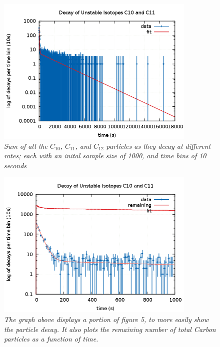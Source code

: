 \documentclass[11pt]{article}
\begin{document}
\begin{figure}[H]
  \begin{center}
\centerline{\includegraphics[width=3.75in]{unstabledecaynozoom_1000.png}}
\caption{\it \small{Sum of all the $C_{10}$, $C_{11}$, and $C_{12}$ particles as they decay at different rates; each with an inital sample size of 1000, and time bins of 10 seconds \label{fig5}}}
  \end{center}
\end{figure}

\begin{figure}[H]
  \begin{center}
\centerline{\includegraphics[width=3.75in]{unstabledecayn_1000_withr.png}}
\caption{\it \small{The graph above displays a portion of figure 5, to more easily show the particle decay.  It also plots the remaining number of total Carbon particles as a function of time. \label{fig6}}}
  \end{center}
\end{figure}
\end{document}
